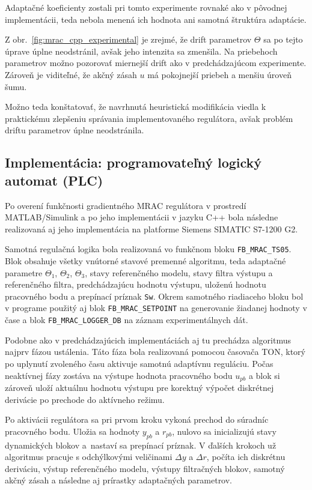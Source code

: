 Adaptačné koeficienty zostali pri tomto experimente rovnaké ako v pôvodnej
implementácii, teda nebola menená ich hodnota ani samotná štruktúra adaptácie.

Z obr.~\ref{fig:mrac_cpp_experimental} je zrejmé, že drift parametrov $\Theta$
sa po tejto úprave úplne neodstránil, avšak jeho intenzita sa zmenšila.
Na priebehoch parametrov možno pozorovať miernejší drift ako v predchádzajúcom
experimente. Zároveň je viditeľné, že akčný zásah $u$ má pokojnejší priebeh
a menšiu úroveň šumu.

Možno teda konštatovať, že navrhnutá heuristická modifikácia viedla
k praktickému zlepšeniu správania implementovaného regulátora, avšak
problém driftu parametrov úplne neodstránila.




\subsection{Implementácia: programovateľný logický automat (PLC)}
\label{sec:mrac_plc_implementation}

Po overení funkčnosti gradientného MRAC regulátora v prostredí MATLAB/Simulink
a po jeho implementácii v jazyku C++ bola následne realizovaná aj jeho
implementácia na platforme Siemens SIMATIC S7-1200 G2.


Samotná regulačná logika bola realizovaná vo funkčnom bloku
\texttt{FB\_MRAC\_TS05}. Blok obsahuje všetky vnútorné stavové premenné
algoritmu, teda adaptačné parametre $\Theta_1$, $\Theta_2$, $\Theta_3$,
stavy referenčného modelu, stavy filtra výstupu a referenčného filtra,
predchádzajúcu hodnotu výstupu, uloženú hodnotu pracovného bodu a prepínací
príznak \texttt{Sw}. Okrem samotného riadiaceho bloku bol v programe použitý
aj blok \texttt{FB\_MRAC\_SETPOINT} na generovanie žiadanej hodnoty v čase
a blok \texttt{FB\_MRAC\_LOGGER\_DB} na záznam experimentálnych dát.

Podobne ako v predchádzajúcich implementáciách aj tu prechádza algoritmus
najprv fázou ustálenia. Táto fáza bola realizovaná pomocou časovača
TON, ktorý po uplynutí zvoleného času aktivuje samotnú adaptívnu
reguláciu. Počas neaktívnej fázy zostáva na výstupe hodnota pracovného bodu
$u_{pb}$ a blok si zároveň uloží aktuálnu hodnotu výstupu pre korektný výpočet
diskrétnej derivácie po prechode do aktívneho režimu.

Po aktivácii regulátora sa pri prvom kroku vykoná prechod do súradníc
pracovného bodu. Uložia sa hodnoty $y_{pb}$ a $r_{pb}$, nulovo sa inicializujú
stavy dynamických blokov a~nastaví sa prepínací príznak. V ďalších krokoch už
algoritmus pracuje s odchýlkovými veličinami $\Delta y$ a $\Delta r$,
počíta ich diskrétnu deriváciu, výstup referenčného modelu, výstupy filtračných
blokov, samotný akčný zásah a následne aj prírastky adaptačných parametrov.

